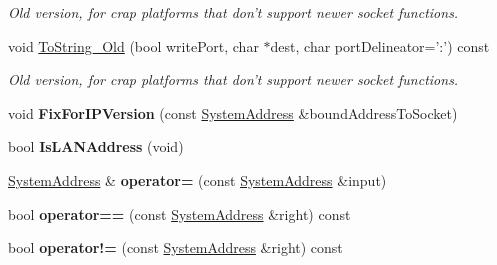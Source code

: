 \begin{DoxyCompactItemize}
\begin{DoxyCompactList}\small\item\em Old version, for crap platforms that don't support newer socket functions. \end{DoxyCompactList}\item 
\hypertarget{struct_rak_net_1_1_system_address_a30851a78678847a68821b75b03793e91}{void \hyperlink{struct_rak_net_1_1_system_address_a30851a78678847a68821b75b03793e91}{To\-String\-\_\-\-Old} (bool write\-Port, char $\ast$dest, char port\-Delineator='\-:') const }\label{struct_rak_net_1_1_system_address_a30851a78678847a68821b75b03793e91}

\begin{DoxyCompactList}\small\item\em Old version, for crap platforms that don't support newer socket functions. \end{DoxyCompactList}\item 
\hypertarget{struct_rak_net_1_1_system_address_a29743fbbb6b257279b3714a628fd4f99}{void {\bfseries Fix\-For\-I\-P\-Version} (const \hyperlink{struct_rak_net_1_1_system_address}{System\-Address} \&bound\-Address\-To\-Socket)}\label{struct_rak_net_1_1_system_address_a29743fbbb6b257279b3714a628fd4f99}

\item 
\hypertarget{struct_rak_net_1_1_system_address_acc9c6339344a12b9141e823d12175cc8}{bool {\bfseries Is\-L\-A\-N\-Address} (void)}\label{struct_rak_net_1_1_system_address_acc9c6339344a12b9141e823d12175cc8}

\item 
\hypertarget{struct_rak_net_1_1_system_address_ac84c65cd46db4d47db63cb48a15df641}{\hyperlink{struct_rak_net_1_1_system_address}{System\-Address} \& {\bfseries operator=} (const \hyperlink{struct_rak_net_1_1_system_address}{System\-Address} \&input)}\label{struct_rak_net_1_1_system_address_ac84c65cd46db4d47db63cb48a15df641}

\item 
\hypertarget{struct_rak_net_1_1_system_address_a16c817307293c6c164e0dd3e32b6c25c}{bool {\bfseries operator==} (const \hyperlink{struct_rak_net_1_1_system_address}{System\-Address} \&right) const }\label{struct_rak_net_1_1_system_address_a16c817307293c6c164e0dd3e32b6c25c}

\item 
\hypertarget{struct_rak_net_1_1_system_address_a921cfb7bf1a24c68ea3c87b28204dccf}{bool {\bfseries operator!=} (const \hyperlink{struct_rak_net_1_1_system_address}{System\-Address} \&right) const }\label{struct_rak_net_1_1_system_address_a921cfb7bf1a24c68ea3c87b28204dccf}


\end{DoxyCompactItemize}
